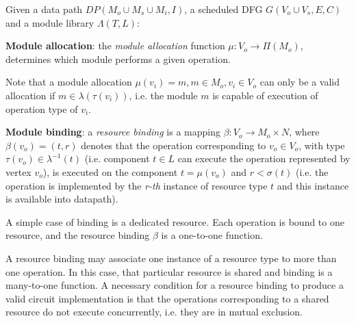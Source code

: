 Given a data path $DP(M_o\cup M_s \cup M_i,I)$, a scheduled D\+FG $G(V_o\cup V_s,E,C)$ and a module library $\Lambda(T,L)$\+:

{\bfseries Module allocation}\+: the {\itshape module allocation} function $\mu :V_o\rightarrow \Pi(M_o)$, determines which module performs a given operation.

Note that a module allocation $\mu(v_i)=m, m\in M_o, v_i\in V_o$ can only be a valid allocation if $m\in \lambda(\tau (v_i))$, i.\+e. the module $m$ is capable of execution of operation type of $v_i$.

{\bfseries Module binding}\+: a {\itshape resource binding} is a mapping $\beta : V_o\rightarrow M_o \times N$, where $\beta(v_o) = (t,r)$ denotes that the operation corresponding to $v_o \in V_o$, with type $\tau(v_o)\in \lambda^{-1}(t)$ (i.\+e. component $t\in L$ can execute the operation represented by vertex $v_o$), is executed on the component $t = \mu(v_o)$ and $r< \sigma(t)$ (i.\+e. the operation is implemented by the {\itshape r-\/th} instance of resource type $t$ and this instance is available into datapath).

A simple case of binding is a dedicated resource. Each operation is bound to one resource, and the resource binding $\beta$ is a one-\/to-\/one function.

A resource binding may associate one instance of a resource type to more than one operation. In this case, that particular resource is shared and binding is a many-\/to-\/one function. A necessary condition for a resource binding to produce a valid circuit implementation is that the operations corresponding to a shared resource do not execute concurrently, i.\+e. they are in mutual exclusion.


